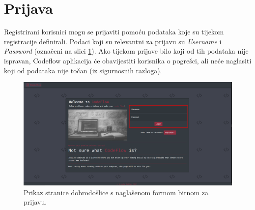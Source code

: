\documentclass[times, utf8, zavrsni]{fer}
\begin{document}
		\section{Prijava}
		Registrirani korisnici mogu se prijaviti pomoću podataka koje su tijekom registracije definirali. Podaci koji su relevantni za prijavu su \textit{Username} i \textit{Password} (označeni na slici \ref{fig:login}). Ako tijekom prijave bilo koji od tih podataka nije ispravan, Codeflow aplikacija će obavijestiti korisnika o pogrešci, ali neće naglasiti koji od podataka nije točan (iz sigurnosnih razloga).
		\begin{figure}[htb]
			\centering
			\includegraphics[width=\linewidth]{pictures/koristenje/Prijava.png}
			\caption{Prikaz stranice dobrodošlice s naglašenom formom bitnom za prijavu.}
			\label{fig:login}
		\end{figure}
	
\end{document}

